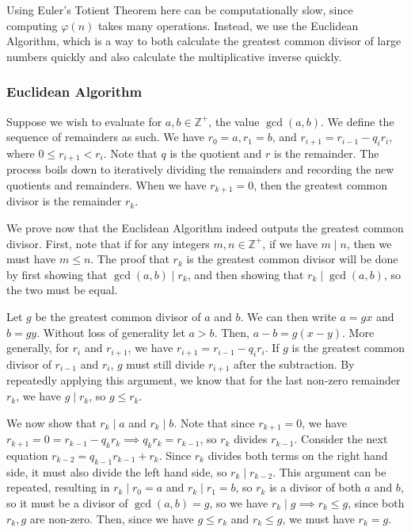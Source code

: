\documentclass{article}
\newcommand{\Z}{\mathbb{Z}}
\begin{document}
Using Euler's Totient Theorem here can be computationally slow, since computing $\varphi(n)$ takes many operations. Instead, we use the Euclidean Algorithm, which is a way to both calculate the greatest common divisor of large numbers quickly and also calculate the multiplicative inverse quickly.
\subsubsection{Euclidean Algorithm}
Suppose we wish to evaluate for $a, b \in \Z^+$, the value $\gcd(a, b).$ We define the sequence of remainders as such. We have $r_0 = a, r_1 = b$, and $r_{i+1} = r_{i-1} - q_i r_i$, where $0 \le r_{i+1} < r_i$. Note that $q$ is the quotient and $r$ is the remainder. The process boils down to iteratively dividing the remainders and recording the new quotients and remainders. When we have $r_{k+1} = 0$, then the greatest common divisor is the remainder $r_k$.

We prove now that the Euclidean Algorithm indeed outputs the greatest common divisor. First, note that if for any integers $m, n \in \Z^+$, if we have $m \mid n$, then we must have $m \le n$. The proof that $r_k$ is the greatest common divisor will be done by first showing that $\gcd(a, b) \mid r_k$, and then showing that $r_k \mid \gcd(a,b)$, so the two must be equal.

Let $g$ be the greatest common divisor of $a$ and $b$. We can then write $a = g x$ and $b = gy$. Without loss of generality let $a > b$. Then, $a - b = g(x-y)$. More generally, for $r_i$ and $r_{i+1}$, we have $r_{i+1} = r_{i-1} - q_i r_i$. If $g$ is the greatest common divisor of $r_{i-1}$ and $r_i$, $g$ must still divide $r_{i+1}$ after the subtraction. By repeatedly applying this argument, we know that for the last non-zero remainder $r_k$, we have $g \mid r_k$, so $g \le r_k$.

We now show that $r_k \mid a$ and $r_k \mid b$. Note that since $r_{k+1} = 0$, we have $r_{k+1} = 0 = r_{k-1} - q_k r_k \implies q_k r_k = r_{k-1}$, so $r_k$ divides $r_{k-1}$. Consider the next equation $r_{k-2} = q_{k-1} r_{k-1} + r_{k}$. Since $r_k$ divides both terms on the right hand side, it must also divide the left hand side, so $r_k \mid r_{k-2}.$ This argument can be repeated, resulting in $r_k \mid r_0 = a$ and $r_k \mid r_1 = b$, so $r_k$ is a divisor of both $a$ and $b$, so it must be a divisor of $\gcd(a,b) = g$, so we have $r_k \mid g \implies r_k \le g$, since both $r_k, g$ are non-zero. Then, since we have $g \le r_k$ and $r_k \le g$, we must have $r_k = g$.
\end{document}

